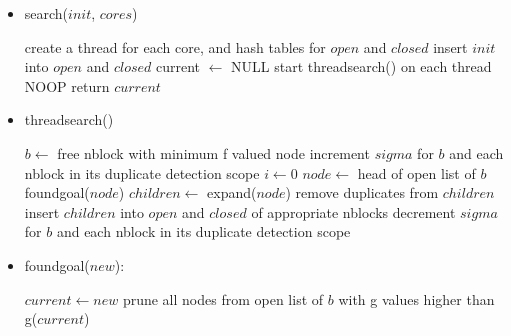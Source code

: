 \documentclass{article}
\begin{document}
\begin{itemize}
  \item search($init$, $cores$)
  \begin{algorithmic}[1]
  \STATE create a thread for each core, and hash tables for $open$ and $closed$
  \STATE insert $init$ into $open$ and $closed$
  \STATE current $\leftarrow$ NULL
  \STATE start threadsearch() on each thread
    \STATE NOOP
  \ENDWHILE
  \STATE return $current$
  \end{algorithmic}

  \item threadsearch()
  \begin{algorithmic}[1]
    \STATE $b \leftarrow$ free nblock with minimum f valued node
    \STATE increment $sigma$ for $b$ and each nblock in its duplicate detection scope
      \STATE $i \leftarrow 0$
    \ENDIF
    \REPEAT
      \STATE $node \leftarrow$ head of open list of $b$
        \STATE foundgoal($node$)
        \STATE $children \leftarrow$ expand($node$)
        \STATE remove duplicates from $children$
        \STATE insert $children$ into $open$ and $closed$ of appropriate nblocks
      \ENDIF
    \STATE {}
    \STATE decrement $sigma$ for $b$ and each nblock in its duplicate detection scope
  \ENDWHILE
  \end{algorithmic}

  \item foundgoal($new$):
  \begin{algorithmic}[1]
        \STATE $current \leftarrow new$
        \STATE prune all nodes from open list of $b$ with g values higher than g($current$)
      \ENDIF
  \end{algorithmic}
\end{itemize}
\end{document}
